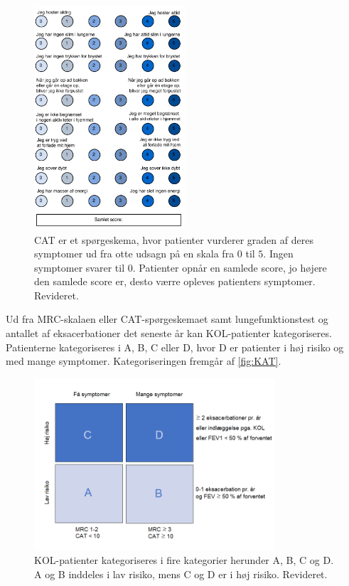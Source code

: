 \begin{figure} [H]
\centering
\includegraphics[width=0.5\textwidth]{figures/CAT}
\caption{CAT er et spørgeskema, hvor patienter vurderer graden af deres symptomer ud fra otte udsagn på en skala fra $0$ til $5$. Ingen symptomer svarer til $0$. Patienter opnår en samlede score, jo højere den samlede score er, desto værre opleves patienters symptomer. Revideret\cite{Basisbogen2016}.}
\label{fig:CAT}
\end{figure} 

\noindent
Ud fra MRC-skalaen eller CAT-spørgeskemaet samt lungefunktionstest og antallet af eksacerbationer det seneste år kan KOL-patienter kategoriseres. Patienterne kategoriseres i A, B, C eller D, hvor D er patienter i høj risiko og med mange symptomer. Kategoriseringen fremgår af \autoref{fig:KAT}.

\begin{figure} [H]
\centering
\includegraphics[width=0.8\textwidth]{figures/KAT}
\caption{KOL-patienter kategoriseres i fire kategorier herunder A, B, C og D. A og B inddeles i lav risiko, mens C og D er i høj risiko. Revideret\cite{Basisbogen2016}.}
\label{fig:KAT}
\end{figure} 
 
